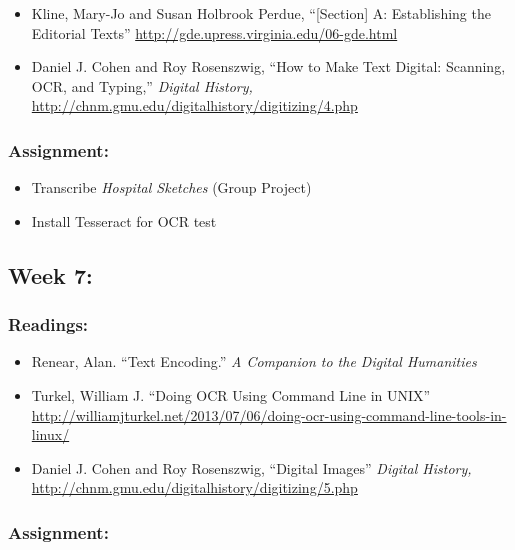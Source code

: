 \documentclass[]{article}
\begin{document}
\begin{itemize}
\itemsep1pt\parskip0pt
\item
  Kline, Mary-Jo and Susan Holbrook Perdue, ``{[}Section{]} A:
  Establishing the Editorial Texts''
  \url{http://gde.upress.virginia.edu/06-gde.html}
\item
  Daniel J. Cohen and Roy Rosenszwig, ``How to Make Text Digital:
  Scanning, OCR, and Typing,'' \emph{Digital History,}
  \url{http://chnm.gmu.edu/digitalhistory/digitizing/4.php}
\end{itemize}

\subsubsection{Assignment:}\label{assignment-4}

\begin{itemize}
\itemsep1pt\parskip0pt
\item
  Transcribe \emph{Hospital Sketches} (Group Project)
\item
  Install Tesseract for OCR test
\end{itemize}

\subsection{Week 7:}\label{week-7}

\subsubsection{Readings:}\label{readings-5}

\begin{itemize}
\itemsep1pt\parskip0pt
\item
  Renear, Alan. ``Text Encoding.'' \emph{A Companion to the Digital
  Humanities}
\item
  Turkel, William J. ``Doing OCR Using Command Line in UNIX''
  \url{http://williamjturkel.net/2013/07/06/doing-ocr-using-command-line-tools-in-linux/}
\item
  Daniel J. Cohen and Roy Rosenszwig, ``Digital Images'' \emph{Digital
  History,} \url{http://chnm.gmu.edu/digitalhistory/digitizing/5.php}
\end{itemize}

\subsubsection{Assignment:}\label{assignment-5}
\end{document}
